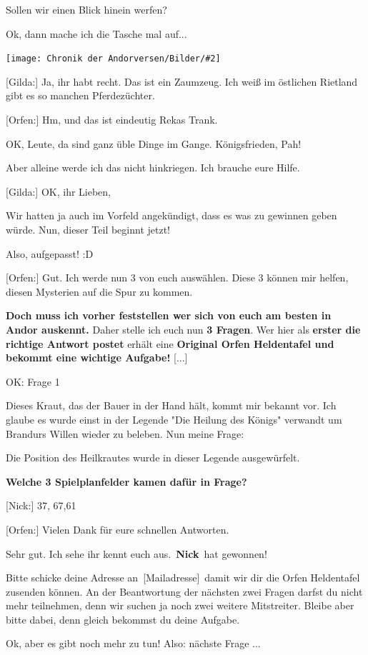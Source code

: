 \documentclass[10pt, a4paper, oneside]{book}
\newcommand{\bildmitts}[2][height=0.32\textwidth,width=0.48\textwidth,keepaspectratio]{%
    \begin{center}
        \texttt{[image: Chronik der Andorversen/Bilder/\#2]}
    \end{center}
}
\begin{document}
\begin{multicols}{2}
Sollen wir einen Blick hinein werfen?

Ok, dann mache ich die Tasche mal auf...

\bildmitts{AA2015 Der Auftrag 4.jpeg}

[Gilda:] Ja, ihr habt recht. Das ist ein Zaumzeug. Ich weiß im östlichen Rietland gibt es so manchen Pferdezüchter.

[Orfen:] Hm, und das ist eindeutig Rekas Trank.

OK, Leute, da sind ganz üble Dinge im Gange. Königsfrieden, Pah!

Aber alleine werde ich das nicht hinkriegen. Ich brauche eure Hilfe.

[Gilda:] OK, ihr Lieben,

Wir hatten ja auch im Vorfeld angekündigt, dass es was zu gewinnen geben würde. Nun, dieser Teil beginnt jetzt!

Also, aufgepasst! :D

[Orfen:] Gut. Ich werde nun 3 von euch auswählen. Diese 3 können mir helfen, diesen Mysterien auf die Spur zu kommen.

\textbf{Doch muss ich vorher feststellen wer sich von euch am besten in Andor auskennt.} Daher stelle ich euch nun \textbf{3 Fragen}. Wer hier als \textbf{erster die richtige Antwort postet} erhält eine \textbf{Original Orfen Heldentafel und bekommt eine wichtige Aufgabe!} [...]

OK: Frage 1

Dieses Kraut, das der Bauer in der Hand hält, kommt mir bekannt vor. Ich glaube es wurde einst in der Legende "Die Heilung des Königs" verwandt um Brandurs Willen wieder zu beleben. Nun meine Frage:

Die Position des Heilkrautes wurde in dieser Legende ausgewürfelt.

\textbf{Welche 3 Spielplanfelder kamen dafür in Frage?}

[Nick:] 37, 67,61

[Orfen:] Vielen Dank für eure schnellen Antworten.

Sehr gut. Ich sehe ihr kennt euch aus. \textbf{Nick} hat gewonnen!

Bitte schicke deine Adresse an [Mailadresse] damit wir dir die Orfen Heldentafel zusenden können. An der Beantwortung der nächsten zwei Fragen darfst du nicht mehr teilnehmen, denn wir suchen ja noch zwei weitere Mitstreiter. Bleibe aber bitte dabei, denn gleich bekommst du deine Aufgabe.

Ok, aber es gibt noch mehr zu tun!
Also: nächste Frage ...


\end{multicols}
\end{document}
